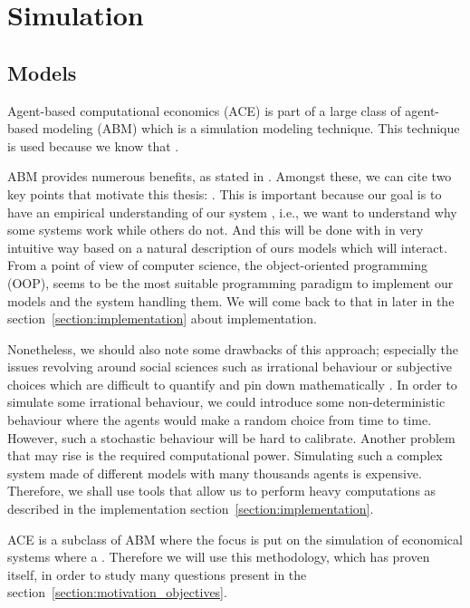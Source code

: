 \chapter{Simulation}


\section{Models}\label{section:models}

Agent-based computational economics (ACE) is part of a large class of agent-based modeling (ABM) which is a simulation modeling technique. This technique is used because we know that .\cite{ABM}

ABM provides numerous benefits, as stated in \cite{ABM}. Amongst these, we can cite two key points that motivate this thesis: . This is important because our goal is to have an empirical understanding of our system \cite{tesfatsion_handbook}, i.e., we want to understand why some systems work while others do not. And this will be done with in very intuitive way based on a natural description of ours models which will interact.
From a point of view of computer science, the object-oriented programming (OOP), seems to be the most suitable programming paradigm to implement our models and the system handling them. We will come back to that in later in the section~\ref{section:implementation} about implementation.

Nonetheless, we should also note some drawbacks of this approach; especially the issues revolving around social sciences such as irrational behaviour or subjective choices which are difficult to quantify and pin down mathematically \cite{ABM}. In order to simulate some irrational behaviour, we could introduce some non-deterministic behaviour where the agents would make a random choice from time to time. However, such a stochastic behaviour will be hard to calibrate. 
Another problem that may rise is the required computational power. Simulating such a complex system made of different models with many thousands agents is expensive. Therefore, we shall use tools that allow us to perform heavy computations as described in the implementation section~\ref{section:implementation}. 

ACE is a subclass of ABM where the focus is put on the simulation of economical systems where a \cite{tesfatsion_complex_adaptive_systems}. Therefore we will use this methodology, which has proven itself, in order to study many questions present in the  section~\ref{section:motivation_objectives}.

